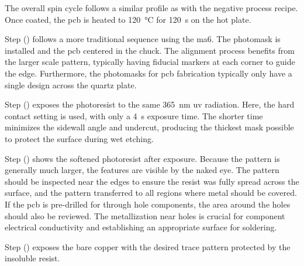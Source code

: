 \documentclass[../../main.tex]{subfiles}
\begin{document}
    The overall spin cycle follows a similar profile as with the negative process recipe.
    Once coated, the \gls{pcb} is heated to \SI{120}{\celsius} for \SI{120}{\second} on the hot plate.
    \par%
    Step () follows a more traditional sequence using the \gls{ma6}.
    The photomask is installed and the \gls{pcb} centered in the chuck.
    The alignment process benefits from the larger scale pattern, typically having fiducial markers at each corner to guide the edge.
	Furthermore, the photomasks for \gls{pcb} fabrication typically only have a single design across the quartz plate.
    \par%
    Step () exposes the photoresist to the same \SI{365}{\nano\meter} \gls{uv} radiation.
    Here, the hard contact setting is used, with only a \SI{4}{\second} exposure time. 
    The shorter time minimizes the sidewall angle and undercut, producing the thickest mask possible to protect the surface during wet etching.
    \par%
    Step () shows the softened photoresist after exposure.
    Because the pattern is generally much larger, the features are visible by the naked eye.
    The pattern should be inspected near the edges to ensure the resist was fully spread across the surface, and the pattern transferred to all regions where metal should be covered.
    If the \gls{pcb} is pre-drilled for through hole components, the area around the holes should also be reviewed.
    The metallization near holes is crucial for component electrical conductivity and establishing an appropriate surface for soldering.  
    \par%
    Step () exposes the bare copper with the desired trace pattern protected by the insoluble resist.
\end{document}
